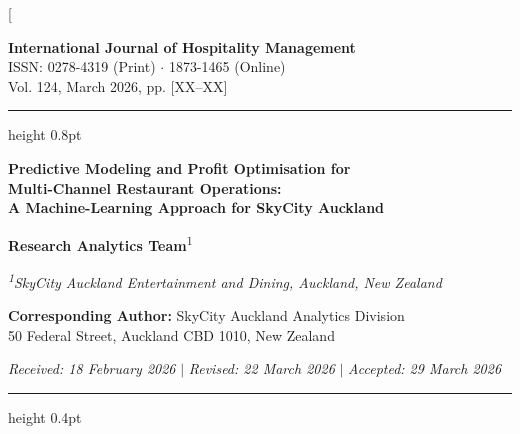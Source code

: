 \documentclass[10pt,a4paper,twocolumn]{article}
\begin{document}
\twocolumn[{%
\begin{@twocolumnfalse}

  \begin{center}
    \small\textbf{International Journal of Hospitality Management} \\
    \small ISSN: 0278-4319 (Print) $\cdot$ 1873-1465 (Online) \\
    \small Vol. 124, March 2026, pp. [XX--XX]
  \end{center}
  \vspace{4pt}
  \hrule height 0.8pt
  \vspace{8pt}

  {\centering
    \Large\bfseries
    Predictive Modeling and Profit Optimisation for\\
    Multi-Channel Restaurant Operations:\\
    A Machine-Learning Approach for SkyCity Auckland
    \par
  }
  \vspace{8pt}

  {\centering\normalsize
    \textbf{Research Analytics Team}\textsuperscript{1}
    \par
  }
  \vspace{4pt}
  {\centering\small\itshape
    \textsuperscript{1}SkyCity Auckland Entertainment and Dining, Auckland, New Zealand
    \par
  }
  \vspace{6pt}

  {\centering\small
    \textbf{Corresponding Author:} SkyCity Auckland Analytics Division\\
    50 Federal Street, Auckland CBD 1010, New Zealand
    \par
  }
  \vspace{6pt}

  {\centering\small
    \textit{Received: 18 February 2026} $\mid$
    \textit{Revised: 22 March 2026} $\mid$
    \textit{Accepted: 29 March 2026}
    \par
  }
  \vspace{10pt}
  \hrule height 0.4pt
  \vspace{10pt}


\end{@twocolumnfalse}}
\end{document}
